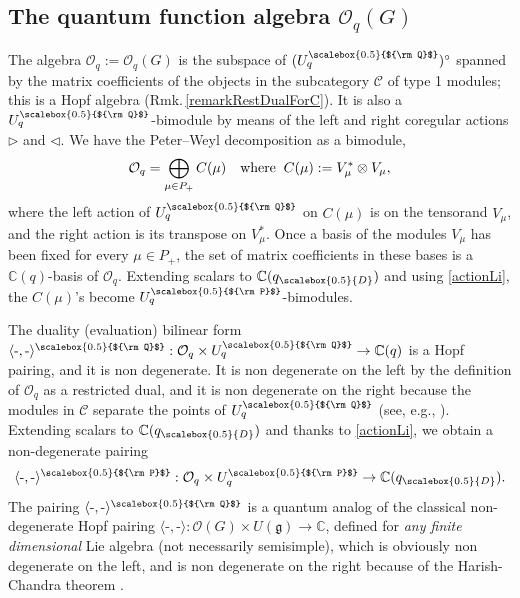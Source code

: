 \documentclass[11pt]{amsart}
\newcommand{\mc}{\mathbb{C}}
\newcommand{\Oo}{\mathcal{O}}
\newcommand{\qD}{q_{\scalebox{0.5}{D}}}
\newcommand{\Q}{{\scalebox{0.5}{${\rm Q}$}}}
\newcommand{\Pup}{{\scalebox{0.5}{${\rm P}$}}}
\begin{document}
\subsection{The quantum function algebra \texorpdfstring{${\mathcal O}_q(G)$}{ }}\label{sec:Oq}
The algebra ${\mathcal O}_q:={\mathcal O}_q(G)$ is the subspace of $(U_q^\Q)^{\circ}$ spanned by the matrix coefficients of the objects in the subcategory $\mathcal{C}$ of type 1 modules; this is a Hopf algebra (Rmk.\,\ref{remarkRestDualForC}). It is also a $U_q^\Q$-bimodule by means of the left and right coregular actions $\rhd$ and $\lhd$. We have the Peter--Weyl decomposition as a bimodule, 
\begin{equation}\label{PWdecomp}
{\mathcal O}_q =\bigoplus_{\mu\in P_+}C(\mu) \quad {\rm where }\;\;C(\mu):=V_{\mu}^*\otimes V_\mu,
\end{equation}
where the left action of $U_q^\Q$ on $C(\mu)$  is on the tensorand $V_\mu$, and the right action is its transpose on $V_{\mu}^*$. Once a basis of the modules $V_\mu$ has been fixed for every $\mu\in P_+$, the set of matrix coefficients in these bases is a ${\mathbb C}(q)$-basis of ${\mathcal O}_q$. Extending scalars to ${\mathbb C}(\qD)$ and using \eqref{actionLi}, the $C(\mu)$'s become $U_q^\Pup$-bimodules.

\smallskip

\indent The duality (evaluation) bilinear form $\langle \text{-},\text{-} \rangle^\Q :{\mathcal O}_q\times U_q^\Q\to {\mathbb C}(q)$ is a Hopf pairing, and it is non degenerate.
It is non degenerate on the left by the definition of $\Oo_q$ as a restricted dual, and it is non degenerate on the right because the modules in ${\mathcal C}$ separate the points of $U_q^\Q$ (see, e.g., \cite[Th.\,3.46]{VY}). Extending scalars to $\mc(\qD)$ and thanks to \eqref{actionLi}, we obtain a non-degenerate pairing
\[ \langle \text{-},\text{-} \rangle^\Pup:{\mathcal O}_q\times U_q^\Pup \to {\mathbb C}(\qD). \]
The pairing $\langle \text{-},\text{-} \rangle^\Q$ is a quantum analog of the classical non-degenerate Hopf pairing $\langle \text{-},\text{-} \rangle :{\mathcal O}(G)\times U(\mathfrak g)\to {\mathbb C}$, defined for {\it any finite dimensional} Lie algebra (not necessarily semisimple), which is obviously non degenerate on the left, and is non degenerate on the right because of the Harish-Chandra theorem \cite[Th.\,2.5.7]{Di}.

\smallskip
\end{document}
